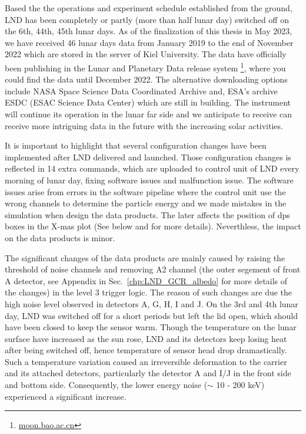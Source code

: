 Based the the operations and experiment schedule established from the ground, \ac{LND} has been completely or partly (more than half lunar day) switched off on the 6th, 44th, 45th lunar days. As of the finalization of this thesis in May 2023, we have received 46 lunar days data from January 2019 to the end of November 2022 which are stored in the server of Kiel University. The data have officially been publishing in the Lunar and Planetary Data release system \footnote{\url{moon.bao.ac.cn}}, where you could find the data until December 2022. 
The alternative downloading options include NASA Space Science Data Coordinated Archive and, ESA's archive ESDC (ESAC Science Data Center) which are still in building. The instrument will continue its operation in the lunar far side and we anticipate to receive can receive more intriguing data in the future with the increasing solar activities.


It is important to highlight that several configuration changes have been implemented after \ac{LND} delivered and launched. Those configuration changes is reflected in 14 extra commands, which are uploaded to control unit of \ac{LND} every morning of lunar day, fixing software issues and malfunction issue. The software issues arise from errors in the software pipeline where the control unit use the wrong channels to determine the particle energy and we made mistakes in the simulation when design the data products. The later affects the position of \ac{dps} boxes in the X-mas plot (See below and \citet{Wimmer-2020-LND} for more details). Neverthless, the impact on the data products is minor. 

The significant changes of the data products are mainly caused by raising the threshold of noise channels and removing A2 channel (the outer segement of front A detector, see Appendix in Sec.~\ref{chp:LND_GCR_albedo} for more details of the changes) in the level 3 trigger logic. The reason of such changes are due the high noise level observed in detectors A, G, H, I and J. 
On the 3rd and 4th lunar day, \ac{LND} was switched off for a short periods but left the lid open, which should have been closed to keep the sensor warm. Though the temperature on the lunar surface have increased as the sun rose, \ac{LND} and its detectors keep losing heat after being switched off, hence temperature of sensor head drop dramastically. Such a temperature variation caused an irreversible deformation to the carrier and its attached detectors, particularly the detector A and I/J in the front side and bottom side. Consequently, the lower energy noise ($\sim$ 10 - 200 keV) experienced a significant increase.

